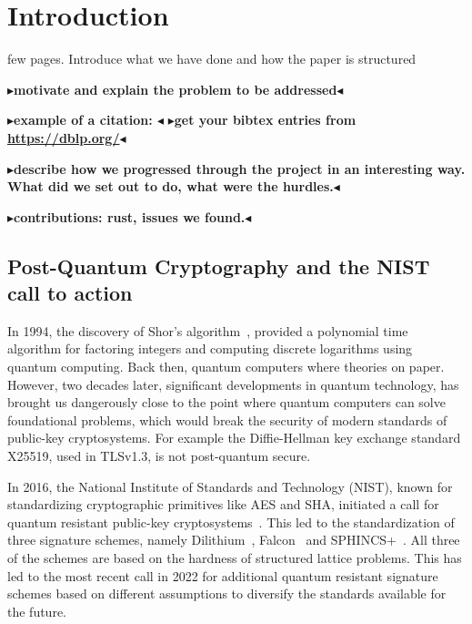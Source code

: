 \documentclass[twoside,11pt,openright]{report}
\theoremstyle{definition}
\theoremstyle{plain}
\newcommand{\todo}[1]{{\color[rgb]{.5,0,0}\textbf{$\blacktriangleright$#1$\blacktriangleleft$}}}
\begin{document}
\chapter{Introduction}
\label{ch:intro}

few pages. Introduce what we have done and how the paper is structured

\todo{motivate and explain the problem to be addressed}

\todo{example of a citation: \cite{DBLP:conf/sas/ChristensenMS03}}
\todo{get your bibtex entries from \url{https://dblp.org/}}

\todo{describe how we progressed through the project in an interesting way. What did we set out to do, what were the hurdles.}

\todo{contributions: rust, issues we found.}

\section{Post-Quantum Cryptography and the NIST call to action}
\label{sec:quantum}

In 1994, the discovery of Shor's algorithm~\cite{shor1997}, provided a polynomial time algorithm for factoring integers and computing discrete logarithms using quantum computing. Back then, quantum computers where theories on paper. However, two decades later, significant developments in quantum technology, has brought us dangerously close to the point where quantum computers can solve foundational problems, which would break the security of modern standards of public-key cryptosystems. For example the Diffie-Hellman key exchange standard X25519, used in TLSv1.3, is not post-quantum secure.

In 2016, the National Institute of Standards and Technology (NIST), known for standardizing cryptographic primitives like AES and SHA, initiated a call for quantum resistant public-key cryptosystems~\cite{nistcall}. This led to the standardization of three signature schemes, namely Dilithium~\cite{ducas2018crystals}, Falcon~\cite{fouque2018falcon} and SPHINCS+~\cite{bernstein2019sphincs+}. All three of the schemes are based on the hardness of structured lattice problems. This has led to the most recent call in 2022 for additional quantum resistant signature schemes based on different assumptions to diversify the standards available for the future.

\end{document}

